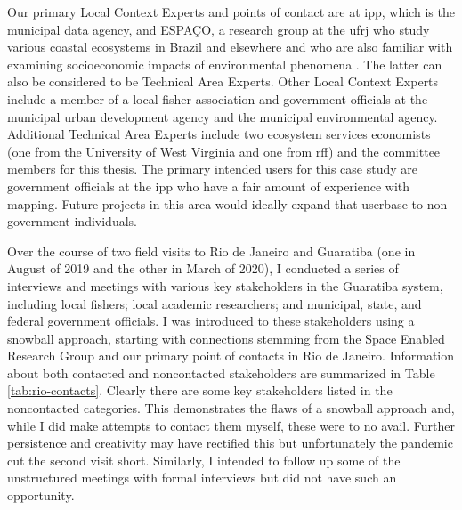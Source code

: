 Our primary Local Context Experts and points of contact are at \ac{ipp}, which is the municipal data agency, and ESPAÇO, a research group at the \ac{ufrj} who study various coastal ecosystems in Brazil and elsewhere \cite{cruzClassificacaoOrientadaObjetos2007, seabraMapeamentoDinamicaCobertura2013} and who are also familiar with examining socioeconomic impacts of environmental phenomena \cite{schwenkResearchEnvironmentalSocioeconomical2008}. The latter can also be considered to be Technical Area Experts. Other Local Context Experts include a member of a local fisher association and government officials at the municipal urban development agency and the municipal environmental agency. Additional Technical Area Experts include two ecosystem services economists (one from the University of West Virginia and one from \ac{rff}) and the committee members for this thesis. The primary intended users for this case study are government officials at the \ac{ipp} who have a fair amount of experience with mapping. Future projects in this area would ideally expand that userbase to non-government individuals. 

Over the course of two field visits to Rio de Janeiro and Guaratiba (one in August of 2019 and the other in March of 2020), I conducted a series of interviews and meetings with various key stakeholders in the Guaratiba system, including local fishers; local academic researchers; and municipal, state, and federal government officials. I was introduced to these stakeholders using a snowball approach, starting with connections stemming from the Space Enabled Research Group and our primary point of contacts in Rio de Janeiro. Information about both contacted and noncontacted stakeholders are summarized in Table \ref{tab:rio-contacts}. Clearly there are some key stakeholders listed in the noncontacted categories. This demonstrates the flaws of a snowball approach and, while I did make attempts to contact them myself, these were to no avail. Further persistence and creativity may have rectified this but unfortunately the pandemic cut the second visit short. Similarly, I intended to follow up some of the unstructured meetings with formal interviews but did not have such an opportunity.

